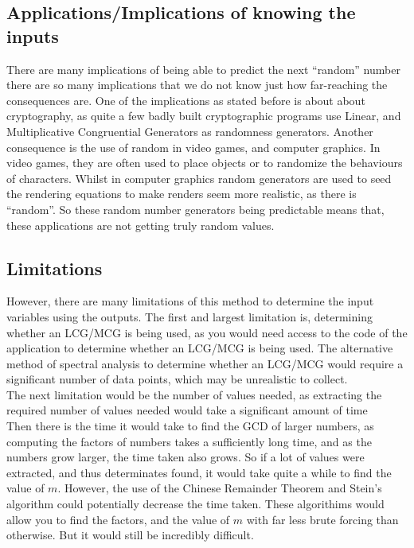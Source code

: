 \documentclass[12pft, english]{article}
\begin{document}
\begin{multicols}{2}
    \subsection{Applications/Implications of knowing the inputs}
    There are many implications of being able to predict the next ``random'' number there are so many implications that we do not know just how far-reaching the consequences are. One of the implications as stated before is about about cryptography, as quite a few badly built cryptographic programs use Linear, and Multiplicative Congruential Generators as randomness generators. Another consequence is the use of random in video games, and computer graphics. In video games, they are often used to place objects or to randomize the behaviours of characters. Whilst in computer graphics random generators are used to seed the rendering equations to make renders seem more realistic, as there is ``random''. So these random number generators being predictable means that, these applications are not getting truly random values.


    \subsection{Limitations}
    However, there are many limitations of this method to determine the input variables using the outputs. The first and largest limitation is, determining whether an LCG/MCG is being used, as you would need access to the code of the application to determine whether an LCG/MCG is being used. The alternative method of spectral analysis to determine whether an LCG/MCG would require a significant number of data points, which may be unrealistic to collect. \\
    The next limitation would be the number of values needed, as extracting the required number of values needed would take a significant amount of time\\
    Then there is the time it would take to find the GCD of larger numbers, as computing the factors of numbers takes a sufficiently long time, and as the numbers grow larger, the time taken also grows. So if a lot of values were extracted, and thus determinates found, it would take quite a while to find the value of \(m\). However, the use of the Chinese Remainder Theorem and Stein's algorithm could potentially decrease the time taken. These algorithims would allow you to find the factors, and the value of \(m\) with far less brute forcing than otherwise. But it would still be incredibly difficult. \\



\end{multicols}
\end{document}
